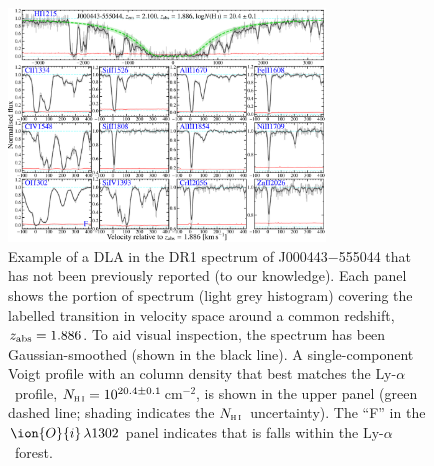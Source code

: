 \documentclass[fleqn,usenatbib,usedcolumn]{mnras}
\newcommand{\pcmsq}{\ensuremath{\textrm{cm}^{-2}}}
\newcommand{\lya}{\ensuremath{\textrm{Ly-}\alpha}}
\newcommand{\zab}{\ensuremath{z_\textrm{\scriptsize abs}}}
\newcommand{\NHI}{\ensuremath{N_\textsc{h\scriptsize{\,i}}}}
\newcommand{\tran}[3]{\ensuremath{\ion{#1}{#2}\,\lambda\textrm{#3}}}
\begin{document}
\begin{figure}
\begin{center}
\includegraphics[width=0.75\textwidth]{DR1_J000443_DLA.pdf}
\vspace{-0.5em}
\caption{Example of a DLA in the DR1 spectrum of J000443$-$555044 that has not been previously reported (to our knowledge). Each panel shows the portion of spectrum (light grey histogram) covering the labelled transition in velocity space around a common redshift, $\zab=1.886$. To aid visual inspection, the spectrum has been Gaussian-smoothed (shown in the black line). A single-component Voigt profile with an  column density that best matches the \lya\ profile, $\NHI=10^{20.4\pm0.1}$\,\pcmsq, is shown in the upper panel (green dashed line; shading indicates the \NHI\ uncertainty). The ``F'' in the \tran{O}{i}{1302} panel indicates that is falls within the \lya\ forest.}
\label{f:egDLA}
\end{center}
\end{figure}
\end{document}
